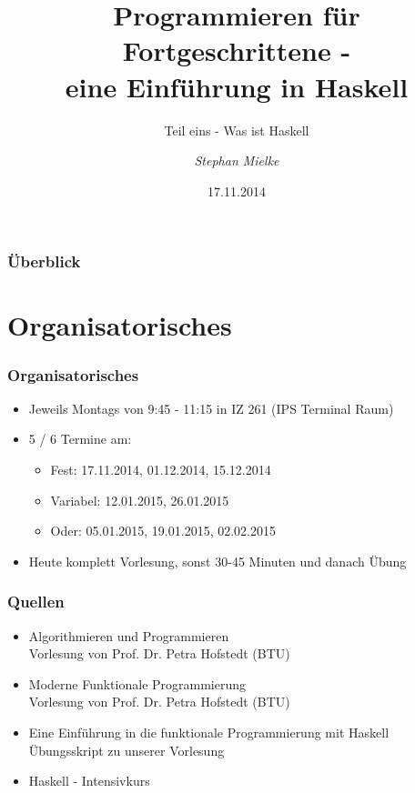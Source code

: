 \documentclass[fleqn,11pt,aspectratio=43]{beamer}
\title{Programmieren für Fortgeschrittene - \\eine Einführung in Haskell}
\author[Stephan Mielke]{\emph{Stephan Mielke}}
\institute[TU Braunschweig, IPS]{Technische Universität Braunschweig, IPS}
\begin{document}
\subtitle{Teil eins - Was ist Haskell} 
\date{17.11.2014}

\begin{frame}
\titlepage
\end{frame}

\begin{frame}[noframenumbering]
  \scriptsize
  \frametitle{Überblick}  
    \tableofcontents[currentsection,sectionstyle=show, hideallsubsections]
\end{frame}

\section*{Organisatorisches~}
\begin{frame}
\frametitle{Organisatorisches}
\begin{block}{\vspace*{-2ex}}
	\begin{itemize}
	  \item Jeweils Montags von 9:45 - 11:15 in IZ 261 (IPS Terminal Raum)
	  \item 5 / 6 Termine am:
	  \begin{itemize}
	  \item Fest: 17.11.2014, 01.12.2014, 15.12.2014
	  \item Variabel: 12.01.2015, 26.01.2015
	  \item Oder: 05.01.2015, 19.01.2015, 02.02.2015
	  \end{itemize}
	  \item Heute komplett \glqq Vorlesung\grqq, sonst 30-45 Minuten und danach Übung 
	\end{itemize}
\end{block}
\end{frame}

\begin{frame}
\frametitle{Quellen}
\begin{block}{\vspace*{-2ex}}	
	\begin{itemize}
	  \item Algorithmieren und Programmieren\\ Vorlesung von Prof. Dr. Petra Hofstedt (BTU)
	  \item Moderne Funktionale Programmierung \\ Vorlesung von Prof. Dr. Petra Hofstedt (BTU)
	  \item Eine Einführung in die funktionale Programmierung mit Haskell \\ Übungsskript zu unserer Vorlesung
	  \item Haskell - Intensivkurs
	\end{itemize}
\end{block}
\end{frame}
\end{document}
